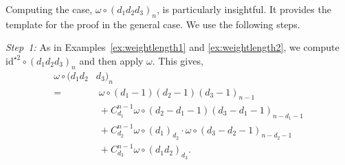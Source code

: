 \documentclass[5p,twocolumn]{elsarticle}
\newcommand*{\id}{{\mathrm{id}}}
\begin{document}
%
\begin{example}\label{ex:weightlength3} 
  Computing the case, $\omega\circ(d_1d_2d_3)_n$, is particularly insightful. It provides the template for the proof in the general case. We use the following steps.
  
  \emph{Step~1:} As in Examples~\ref{ex:weightlength1} and \ref{ex:weightlength2}, we compute $\id^{\star2}\circ(d_1d_2d_3)_n$ and then apply $\omega$. This gives,
   \begin{align}
     \omega\circ(d_1d_2&d_3)_n\nonumber\\
                      =&\;\omega\circ(d_1-1)(d_2-1)(d_3-1)_{n-1}\nonumber\\
                       &\;+C_{d_1}^{n-1}\omega\circ(d_2-d_1-1)(d_3-d_1-1)_{n-d_1-1}\nonumber\\
                       &\;+C_{d_2}^{n-1}\omega\circ(d_1)_{d_2}\cdot\omega\circ(d_3-d_2-1)_{n-d_2-1}\nonumber\\
                       &\;+C_{d_3}^{n-1}\omega\circ(d_1d_2)_{d_3}.\label{eq:weight3part1}
   \end{align}
   

\end{example}
\end{document}
